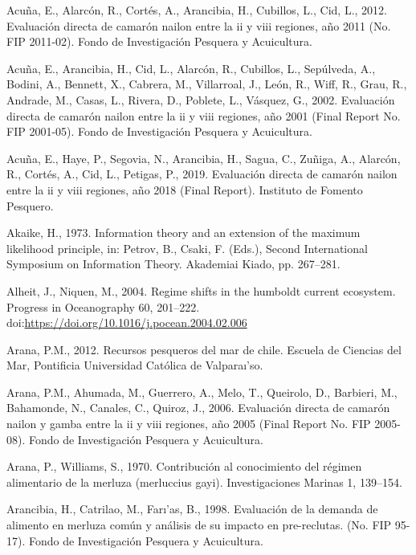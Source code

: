 \documentclass[12pt]{article}
\begin{document}
\hypertarget{refs}{}
\leavevmode\hypertarget{ref-Acunaetal2012}{}%
Acuña, E., Alarcón, R., Cortés, A., Arancibia, H., Cubillos, L., Cid,
L., 2012. Evaluación directa de camarón nailon entre la ii y viii
regiones, año 2011 (No. FIP 2011-02). Fondo de Investigación Pesquera y
Acuicultura.

\leavevmode\hypertarget{ref-Acunaetal:2002}{}%
Acuña, E., Arancibia, H., Cid, L., Alarcón, R., Cubillos, L., Sepúlveda,
A., Bodini, A., Bennett, X., Cabrera, M., Villarroal, J., León, R.,
Wiff, R., Grau, R., Andrade, M., Casas, L., Rivera, D., Poblete, L.,
Vásquez, G., 2002. Evaluación directa de camarón nailon entre la ii y
viii regiones, año 2001 (Final Report No. FIP 2001-05). Fondo de
Investigación Pesquera y Acuicultura.

\leavevmode\hypertarget{ref-Acunaetal2019}{}%
Acuña, E., Haye, P., Segovia, N., Arancibia, H., Sagua, C., Zuñiga, A.,
Alarcón, R., Cortés, A., Cid, L., Petigas, P., 2019. Evaluación directa
de camarón nailon entre la ii y viii regiones, año 2018 (Final Report).
Instituto de Fomento Pesquero.

\leavevmode\hypertarget{ref-Akaike1973}{}%
Akaike, H., 1973. Information theory and an extension of the maximum
likelihood principle, in: Petrov, B., Csaki, F. (Eds.), Second
International Symposium on Information Theory. Akademiai Kiado, pp.
267--281.

\leavevmode\hypertarget{ref-ALHEIT2004201}{}%
Alheit, J., Niquen, M., 2004. Regime shifts in the humboldt current
ecosystem. Progress in Oceanography 60, 201--222.
doi:\href{https://doi.org/https://doi.org/10.1016/j.pocean.2004.02.006}{https://doi.org/10.1016/j.pocean.2004.02.006}

\leavevmode\hypertarget{ref-Arana2012}{}%
Arana, P.M., 2012. Recursos pesqueros del mar de chile. Escuela de
Ciencias del Mar, Pontificia Universidad Católica de Valparaı'so.

\leavevmode\hypertarget{ref-Aranaetal:2006}{}%
Arana, P.M., Ahumada, M., Guerrero, A., Melo, T., Queirolo, D.,
Barbieri, M., Bahamonde, N., Canales, C., Quiroz, J., 2006. Evaluación
directa de camarón nailon y gamba entre la ii y viii regiones, año 2005
(Final Report No. FIP 2005-08). Fondo de Investigación Pesquera y
Acuicultura.

\leavevmode\hypertarget{ref-AranaWilliams1970}{}%
Arana, P., Williams, S., 1970. Contribución al conocimiento del régimen
alimentario de la merluza (merluccius gayi). Investigaciones Marinas 1,
139--154.

\leavevmode\hypertarget{ref-Arancibiaetal1998}{}%
Arancibia, H., Catrilao, M., Farı'as, B., 1998. Evaluación de la demanda
de alimento en merluza común y análisis de su impacto en pre-reclutas.
(No. FIP 95-17). Fondo de Investigación Pesquera y Acuicultura.
\end{document}

